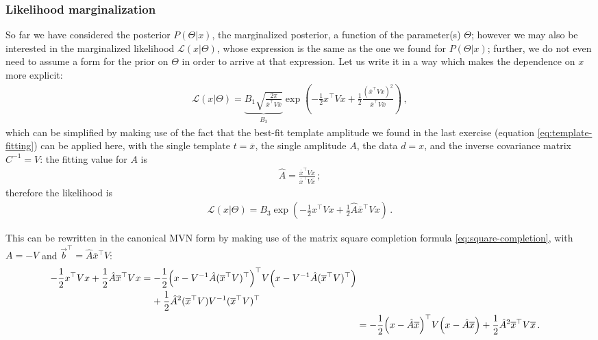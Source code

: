 \documentclass[main.tex]{subfiles}
\begin{document}
\subsubsection{Likelihood marginalization}

So far we have considered the posterior \(P(\Theta | x)\), the marginalized posterior, a function of the parameter(s) \(\Theta \); however we may also be interested in the marginalized likelihood \(\mathscr{L}(x | \Theta )\), whose expression is the same as the one we found for \(P(\Theta | x)\); further, we do not even need to assume a form for the prior on \(\Theta \) in order to arrive at that expression. Let us write it in a way which makes the dependence on \(x\) more explicit: 
%
\begin{align} \label{eq:marginalized-likelihood}
\mathscr{L}(x | \Theta ) = \underbrace{B_1 \sqrt{\frac{2 \pi }{\overline{x}^{\top} V \overline{x}}}}_{B_3 } \exp(- \frac{1}{2} x^{\top} V x + 
\frac{1}{2}
\frac{(\overline{x}^{\top} V x)^2}{\overline{x}^{\top} V \overline{x}})
\,,
\end{align}
%
which can be simplified by making use of the fact that the best-fit template amplitude we found in the last exercise (equation \eqref{eq:template-fitting}) can be applied here, with the single template \(t = \overline{x}\), the single amplitude \(A\), the data \(d = x\), and the inverse covariance matrix \(C^{-1}= V\): the fitting value for \(A \) is 
%
\begin{align}
\hat{A} = \frac{\overline{x}^{\top} V x}{\overline{x}^{\top} V \overline{x}}
\,;
\end{align}
%
therefore the likelihood is 
%
\begin{align}
\mathscr{L}(x | \Theta ) = B_3 \exp(- \frac{1}{2} x^{\top} V x +
\frac{1}{2}
 \hat{A} \overline{x}^{\top} V x)
\,.
\end{align}

This can be rewritten in the canonical MVN form by making use of the matrix square completion formula \eqref{eq:square-completion}, with \(A = -V\) and \(\vec{b}^{\top} = \hat{A} \overline{x}^{\top} V\): 
%
\begin{align}
\begin{split}
- \frac{1}{2} x^{\top} V x + \frac{1}{2} \hat{A} \overline{x}^{\top} V x
&= - \frac{1}{2} 
\qty(x - V^{-1} \hat{A} (\overline{x}^{\top} V)^{\top})^{\top} V
\qty(x - V^{-1} \hat{A} (\overline{x}^{\top} V)^{\top}) \\
&\phantom{=}\ 
+ \frac{1}{2} \hat{A}^2 (\overline{x}^{\top} V) V^{-1} (\overline{x}^{\top} V)^{\top}  
\end{split}\\
&= - \frac{1}{2} 
\qty(x - \hat{A} \overline{x})^{\top}
V 
\qty(x - \hat{A} \overline{x})
+ 
\frac{1}{2} \hat{A}^2 \overline{x}^{\top} V \overline{x}
\,.
\end{align}
\end{document}
